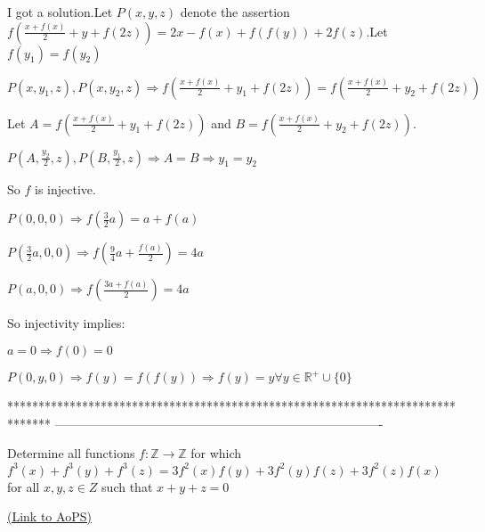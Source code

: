 


\begin{solution}
	I got a solution.Let $P(x,y,z)$ denote the assertion $f(\frac{x+f(x)}{2}+y+f(2z))=2x-f(x)+f(f(y))+2f(z)$.Let $f(y_1)=f(y_2)$

$P(x,y_1,z),P(x,y_2,z) \Rightarrow f(\frac{x+f(x)}{2}+y_1+f(2z))=f(\frac{x+f(x)}{2}+y_2+f(2z))$

Let $A=f(\frac{x+f(x)}{2}+y_1+f(2z))$ and $B=f(\frac{x+f(x)}{2}+y_2+f(2z))$.

$P(A,\frac{y_2}{2},z),P(B, \frac{y_1}{2},z) \Rightarrow A=B \Rightarrow y_1=y_2$

So $f$ is injective.

$P(0,0,0) \Rightarrow f(\frac{3}{2} a)=a+f(a)$

$P(\frac{3}{2}a,0,0) \Rightarrow f(\frac{9}{4}a +\frac{f(a)}{2})=4a$

$P(a,0,0) \Rightarrow f(\frac{3a+f(a)}{2})=4a$

So injectivity implies:

$a=0 \Rightarrow f(0)=0$

$P(0,y,0) \Rightarrow f(y)=f(f(y)) \Rightarrow f(y)=y  \forall y  \in \mathbb{R}^{+} \cup \{0 \}$
\end{solution}
*******************************************************************************
-------------------------------------------------------------------------------

\begin{problem}
	Determine all functions $f: \mathbb{Z}\to\mathbb{Z}$ for which $f^3(x)+f^3(y)+f^3(z)=3f^2(x)f(y)+3f^2(y)f(z)+3f^2(z)f(x)$ for all $x,y,z{\in}Z$ such that $x+y+z=0$

	\flushright \href{https://artofproblemsolving.com/community/c6h1589380}{(Link to AoPS)}
\end{problem}



